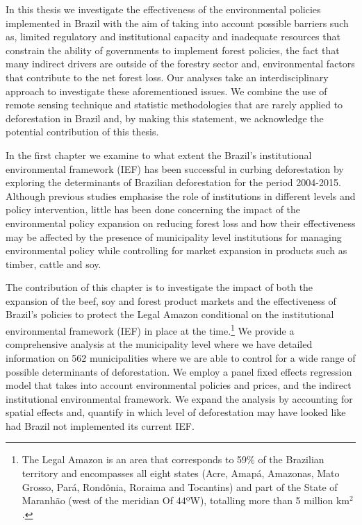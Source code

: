 In this thesis we investigate the effectiveness of the environmental policies implemented in Brazil with the aim of taking into account possible barriers such as, limited regulatory and institutional capacity and inadequate resources that constrain the ability of governments to implement forest policies, the fact that many indirect drivers are outside of the forestry sector and, environmental factors that contribute to the net forest loss. Our analyses take an interdisciplinary approach to investigate these aforementioned issues. We combine the use of remote sensing technique and statistic methodologies that are rarely applied to deforestation in Brazil and, by making this statement, we acknowledge the potential contribution of this thesis. 

In the first chapter we examine to what extent the Brazil's institutional environmental framework (IEF) has been successful in curbing deforestation by exploring the determinants of Brazilian deforestation for the period 2004-2015. Although previous studies \citep{ARAUJO, OLIVEIRA2,BORGES,NEPSTAD,VALENTIM2,pailler_2018} emphasise the role of institutions in different levels and policy intervention, little has been done concerning the impact of the environmental policy expansion on reducing forest loss and how their effectiveness may be affected by the presence of municipality level institutions for managing environmental policy while controlling for market expansion in products such as timber, cattle and soy.

The contribution of this chapter is to investigate the impact of both the expansion of the beef, soy and forest product markets and the effectiveness of Brazil's policies to protect the Legal Amazon conditional on the institutional environmental framework (IEF) in place at the time.\footnote{The Legal Amazon is an area that corresponds to 59$\%$ of the Brazilian territory and encompasses all eight states (Acre, Amapá, Amazonas, Mato Grosso, Pará, Rondônia, Roraima and Tocantins) and part of the State of Maranhão (west of the meridian Of 44ºW), totalling more than 5 million km$^{2}$.} We provide a comprehensive analysis at the municipality level where we have detailed information on 562 municipalities where we are able to control for a wide range of possible determinants of deforestation. We employ a panel fixed effects regression model that takes into account environmental policies and prices, and the indirect institutional environmental framework. We expand the analysis by accounting for spatial effects and, quantify in which level of deforestation may have looked like had Brazil not implemented its current IEF.

